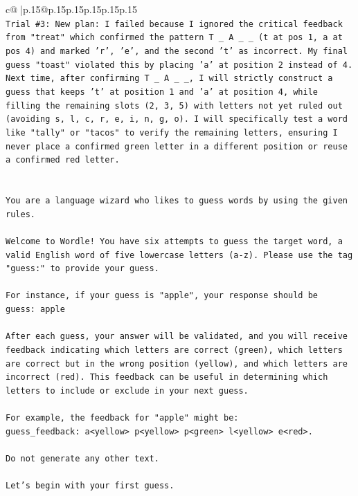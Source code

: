 \documentclass{article}
\begin{document}
{\begin{supertabular}{c@{$\;$}|p{.15\linewidth}@{}p{.15\linewidth}p{.15\linewidth}p{.15\linewidth}p{.15\linewidth}p{.15\linewidth}}
{{{\\ 
\texttt{Trial \#3: New plan: I failed because I ignored the critical feedback from "treat" which confirmed the pattern T \_ A \_ \_ (t at pos 1, a at pos 4) and marked 'r', 'e', and the second 't' as incorrect. My final guess "toast" violated this by placing 'a' at position 2 instead of 4. Next time, after confirming T \_ A \_ \_, I will strictly construct a guess that keeps 't' at position 1 and 'a' at position 4, while filling the remaining slots (2, 3, 5) with letters not yet ruled out (avoiding s, l, c, r, e, i, n, g, o). I will specifically test a word like "tally" or "tacos" to verify the remaining letters, ensuring I never place a confirmed green letter in a different position or reuse a confirmed red letter.} \\
\\ 
\\ 
\texttt{You are a language wizard who likes to guess words by using the given rules.} \\
\\ 
\texttt{Welcome to Wordle! You have six attempts to guess the target word, a valid English word of five lowercase letters (a{-}z). Please use the tag "guess:" to provide your guess.} \\
\\ 
\texttt{For instance, if your guess is "apple", your response should be} \\
\texttt{guess: apple} \\
\\ 
\texttt{After each guess, your answer will be validated, and you will receive feedback indicating which letters are correct (green), which letters are correct but in the wrong position (yellow), and which letters are incorrect (red). This feedback can be useful in determining which letters to include or exclude in your next guess.} \\
\\ 
\texttt{For example, the feedback for "apple" might be:} \\
\texttt{guess\_feedback: a<yellow> p<yellow> p<green> l<yellow> e<red>.} \\
\\ 
\texttt{Do not generate any other text.} \\
\\ 
\texttt{Let's begin with your first guess.} \\
            }
        }
    }
     \\ \\


\end{supertabular}}
\end{document}
